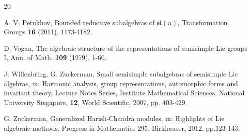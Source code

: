 \documentclass[default]{./styles/svmult}
\renewcommand{\sl}{\mathfrak{sl}}
\begin{document}
\begin{thebibliography}{20}
\vspace{.25cm}

 A. V. Petukhov, Bounded reductive subalgebras of $\sl(n)$, Transformation Groups \textbf{16} (2011), 1173-1182. 

\vspace{.25cm}

 D. Vogan, The algebraic structure of the representations of semisimple Lie groups I, Ann. of Math. \textbf{109} (1979), 1-60.

\vspace{.25cm}

 J. Willenbring, G. Zuckerman, Small semisimple subalgebras of semisimple Lie algebras, in: Harmonic analysis, group representations, automorphic forms and invariant theory, Lecture Notes Series, Institute Mathematical Sciences, National University Singapore, \textbf{12}, World Scientific, 2007, pp. 403-429. 

\vspace{.25cm}

 G. Zuckerman, Generalized Harish-Chandra modules, in: Highlights of Lie algebraic methods, Progress in Mathematics 295, Birkhauser, 2012, pp.123-143.  
\end{thebibliography}
\end{document}
